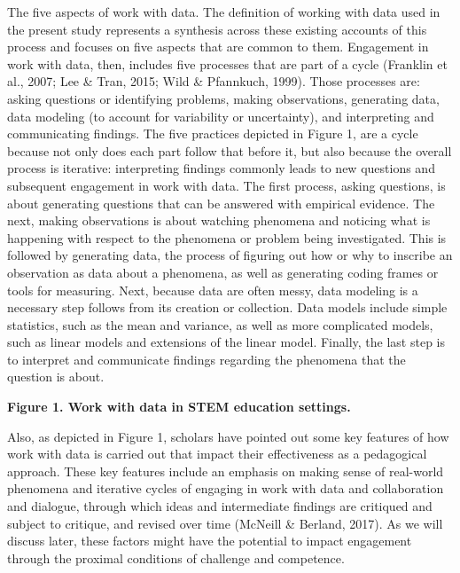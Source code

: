 \documentclass[]{msu-thesis}
\theoremstyle{definition}
\theoremstyle{definition}
\theoremstyle{definition}
\theoremstyle{remark}
\begin{document}
The five aspects of work with data. The definition of working with data
used in the present study represents a synthesis across these existing
accounts of this process and focuses on five aspects that are common to
them. Engagement in work with data, then, includes five processes that
are part of a cycle (Franklin et al., 2007; Lee \& Tran, 2015; Wild \&
Pfannkuch, 1999). Those processes are: asking questions or identifying
problems, making observations, generating data, data modeling (to
account for variability or uncertainty), and interpreting and
communicating findings. The five practices depicted in Figure 1, are a
cycle because not only does each part follow that before it, but also
because the overall process is iterative: interpreting findings commonly
leads to new questions and subsequent engagement in work with data. The
first process, asking questions, is about generating questions that can
be answered with empirical evidence. The next, making observations is
about watching phenomena and noticing what is happening with respect to
the phenomena or problem being investigated. This is followed by
generating data, the process of figuring out how or why to inscribe an
observation as data about a phenomena, as well as generating coding
frames or tools for measuring. Next, because data are often messy, data
modeling is a necessary step follows from its creation or collection.
Data models include simple statistics, such as the mean and variance, as
well as more complicated models, such as linear models and extensions of
the linear model. Finally, the last step is to interpret and communicate
findings regarding the phenomena that the question is about.

\textbf{Figure 1. Work with data in STEM education settings.}

Also, as depicted in Figure 1, scholars have pointed out some key
features of how work with data is carried out that impact their
effectiveness as a pedagogical approach. These key features include an
emphasis on making sense of real-world phenomena and iterative cycles of
engaging in work with data and collaboration and dialogue, through which
ideas and intermediate findings are critiqued and subject to critique,
and revised over time (McNeill \& Berland, 2017). As we will discuss
later, these factors might have the potential to impact engagement
through the proximal conditions of challenge and competence.
\end{document}
